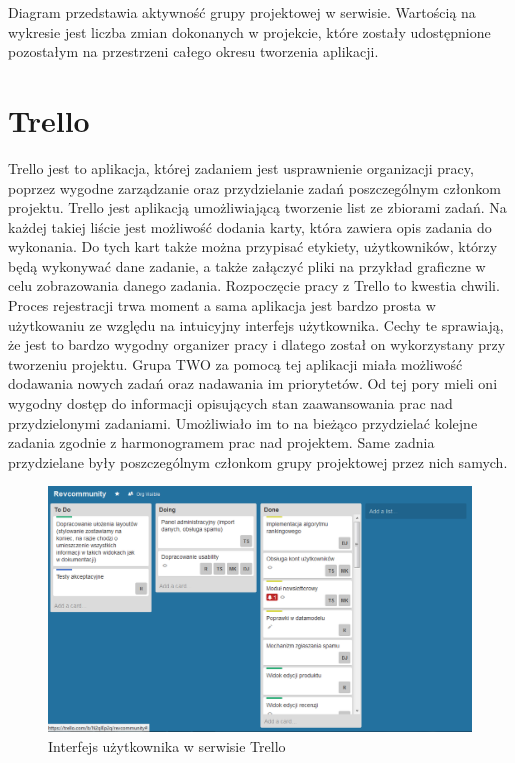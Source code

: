 Diagram przedstawia aktywność grupy projektowej w serwisie. Wartością na wykresie jest liczba zmian dokonanych w projekcie, które zostały udostępnione pozostałym na przestrzeni całego  okresu tworzenia aplikacji. 

\section{Trello}
Trello jest to aplikacja, której zadaniem jest usprawnienie organizacji pracy, poprzez wygodne zarządzanie oraz przydzielanie zadań poszczególnym członkom projektu. Trello jest aplikacją umożliwiającą tworzenie list ze zbiorami zadań. Na każdej takiej liście jest możliwość dodania karty, która zawiera opis zadania do wykonania. Do tych kart także można przypisać etykiety, użytkowników, którzy będą wykonywać dane zadanie, a także załączyć pliki  na przykład graficzne w celu zobrazowania danego zadania. Rozpoczęcie pracy z Trello  to kwestia chwili. Proces rejestracji trwa moment a sama aplikacja jest bardzo prosta w użytkowaniu ze względu na intuicyjny interfejs użytkownika. Cechy te sprawiają, że jest to bardzo wygodny organizer pracy i dlatego został on wykorzystany przy tworzeniu projektu. Grupa TWO za pomocą tej aplikacji miała możliwość dodawania nowych zadań oraz nadawania im priorytetów. Od tej pory mieli oni wygodny dostęp do informacji opisujących stan zaawansowania prac nad przydzielonymi zadaniami. Umożliwiało im to na bieżąco przydzielać kolejne zadania zgodnie z harmonogramem prac nad projektem. Same zadnia przydzielane były poszczególnym członkom grupy projektowej przez nich samych. 

\begin{figure}[h]
	\centering
	\includegraphics[width=1.00\textwidth]{images/trello.png}
	\caption{Interfejs użytkownika w serwisie Trello}
\end{figure}


